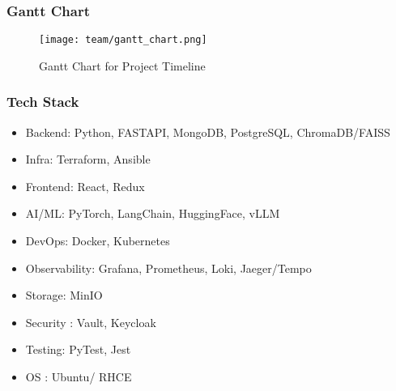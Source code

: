 \begin{frame}
\frametitle{Gantt Chart}
\begin{figure}
    \centering
    \texttt{[image: team/gantt\_chart.png]}
    \caption{Gantt Chart for Project Timeline}
    \label{fig:gantt_chart}
\end{figure}
\end{frame}

\begin{frame}
    \frametitle{Tech Stack}
    \begin{itemize}
        \item Backend: Python, FASTAPI, MongoDB, PostgreSQL, ChromaDB/FAISS 
        \item Infra: Terraform, Ansible
        \item Frontend: React, Redux
        \item AI/ML: PyTorch, LangChain, HuggingFace, vLLM
        \item DevOps: Docker, Kubernetes
        \item Observability: Grafana, Prometheus, Loki, Jaeger/Tempo
        \item Storage: MinIO    
        \item Security : Vault, Keycloak
        \item Testing: PyTest, Jest 
        \item OS : Ubuntu/ RHCE
    \end{itemize}
\end{frame}


